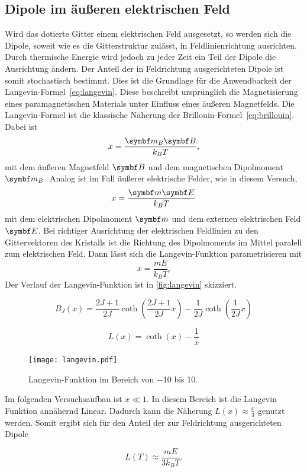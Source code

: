 \subsection{Dipole im äußeren elektrischen Feld }

Wird das dotierte Gitter einem elektrischen Feld ausgesetzt, so werden sich die Dipole,
soweit wie es die Gitterstruktur zulässt, in Feldlinienrichtung ausrichten.
Durch thermische Energie wird jedoch zu jeder Zeit ein Teil der Dipole die Ausrichtung ändern.
Der Anteil der in Feldrichtung ausgerichteten Dipole ist somit stochastisch bestimmt.
Dies ist die Grundlage für die Anwendbarkeit der Langevin-Formel~\eqref{eq:langevin}.
Diese beschreibt ursprünglich die Magnetisierung eines paramagnetischen Materials unter Einfluss eines äußeren Magnetfelds.
Die Langevin-Formel ist die klassische
Näherung der Brillouin-Formel~\eqref{eq:brillouin}.
Dabei ist
\begin{equation}
  x = \frac{\v{m}_B \v{B}}{k_B T},
\end{equation}
mit dem äußeren Magnetfeld $\v{B}$ und dem magnetischen Dipolmoment $\v{m}_B$.
Analog ist im Fall äußerer elektrische Felder, wie in diesem Versuch,
\begin{equation}
  x = \frac{\v{m} \v{E}}{k_B T}
\end{equation}
mit dem elektrischen Dipolmoment $\v{m}$ und dem externen elektrischen Feld $\v{E}$.
Bei richtiger Ausrichtung der elektrischen Feldlinien zu den Gittervektoren des Kristalls ist die Richtung des Dipolmoments im Mittel paralell zum elektrischen Feld.
Dann lässt sich die Langevin-Funktion parametrisieren mit
\begin{equation}
  x= \frac{m E}{k_B T}.
\end{equation}
Der Verlauf der Langevin-Funktion ist in \autoref{fig:langevin} skizziert.

\begin{equation}
  B_J(x) =   \frac{2J + 1}{2J} \coth\!\left( \frac{2J + 1}{2J} x \right)
           - \frac{1}{2J} \coth\!\left(\frac{1}{2J} x \right)
  \label{eq:brillouin}
\end{equation}

\begin{equation}
  \label{eq:langevin}
  L(x) = \coth(x) - \frac{1}{x}
\end{equation}

\begin{figure}
  \texttt{[image: langevin.pdf]}
  \caption{Langevin-Funktion im Bereich von \num{-10} bis \num{10}.}
  \label{fig:langevin}
\end{figure}


Im folgenden Versuchsaufbau ist $ x \ll 1 $. In diesem Bereich ist die Langevin Funktion annähernd Linear.
Dadurch kann die Näherung $L(x) \approx \frac{x}{3}$ genutzt werden.
Somit ergibt sich für den Anteil der zur Feldrichtung ausgerichteten Dipole

\begin{equation}
  L(T) \approx \frac{m E}{3 k_B T}.
  \label{eq:dipoles}
\end{equation}
